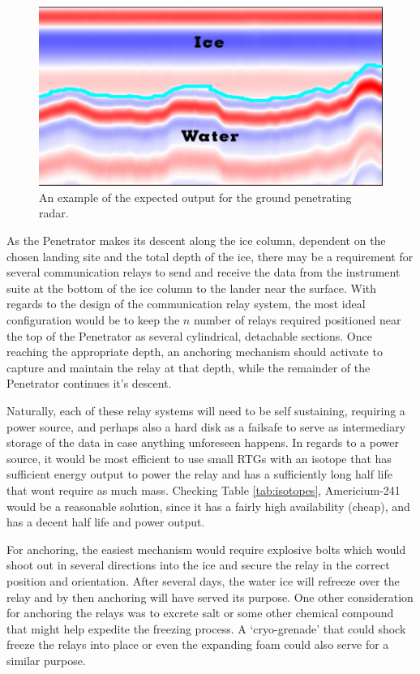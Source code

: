 \begin{figure}[h!]
	\begin{center}
		\includegraphics[width=0.7\columnwidth]{figures/JP/icebottom.png}
		\caption{An example of the expected output for the ground penetrating radar.\cite{iceradar} \label{fig:icebottom}}
	\end{center}
\end{figure}

As the Penetrator makes its descent along the ice column, dependent on the chosen landing site and the total depth of the ice, there may be a requirement for several communication relays to send and receive the data from the instrument suite at the bottom of the ice column to the lander near the surface. With regards to the design of the communication relay system, the most ideal configuration would be to keep the $n$ number of relays required positioned near the top of the Penetrator as several cylindrical, detachable sections. Once reaching the appropriate depth, an anchoring mechanism should activate to capture and maintain the relay at that depth, while the remainder of the Penetrator continues it's descent.

Naturally, each of these relay systems will need to be self sustaining, requiring a power source, and perhaps also a hard disk as a failsafe to serve as intermediary storage of the data in case anything unforeseen happens. In regards to a power source, it would be most efficient to use small RTGs with an isotope that has sufficient energy output to power the relay and has a sufficiently long half life that wont require as much mass. Checking Table \ref{tab:isotopes}, Americium-241 would be a reasonable solution, since it has a fairly high availability (cheap), and has a decent half life and power output.

For anchoring, the easiest mechanism would require explosive bolts which would shoot out in several directions into the ice and secure the relay in the correct position and orientation. After several days, the water ice will refreeze over the relay and by then anchoring will have served its purpose. One other consideration for anchoring the relays was to excrete salt or some other chemical compound that might help expedite the freezing process. A `cryo-grenade' that could shock freeze the relays into place or even the expanding foam could also serve for a similar purpose.

